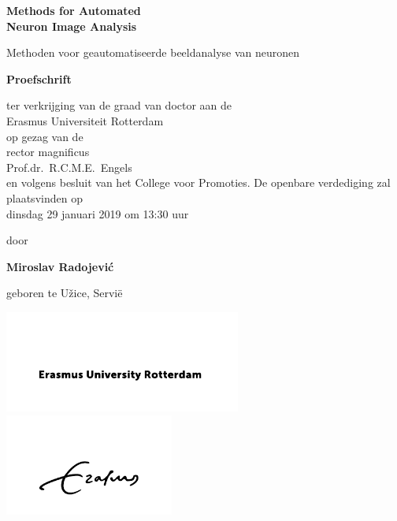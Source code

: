 %
%

\setlength{\parindent}{0pt}
\thispagestyle{empty}

\begin{center}
  
  \vspace*{5mm}
  {\huge\bf Methods for Automated\\[0.3ex] Neuron Image Analysis\\}

  \vfill
  \vfill
  \vfill

  {\large Methoden voor geautomatiseerde beeldanalyse van neuronen\\[1ex]}


  \vfill
  \vfill
  \vfill
  \vfill

  {\large\bf Proefschrift}
  {\large 
  \vfill
  \vfill
  
  \normalsize
  
  ter verkrijging van de graad van doctor aan de \\Erasmus Universiteit Rotterdam\\
op gezag van de \\rector magnificus\\
  \vfill
Prof.dr.~R.C.M.E.~Engels\\ 
  \vfill
en volgens besluit van het College voor Promoties. 
  \vfill
De openbare verdediging zal plaatsvinden op \\dinsdag 29 januari 2019 om 13:30 uur
  
  
  \vfill
  \vfill
  
  \large
  door}

  \vfill
  \vfill
  \vfill

  {\large\bf Miroslav Radojevi\'{c}}

  \vfill

  {\large geboren te U\v{z}ice, Servi{\"e}}

  \vfill
\includegraphics[height=9em]{./logos/EUR_line_02_RGB_black}
\includegraphics[height=9em]{./logos/EUR_signature_02_RGB_black}
\end{center}


